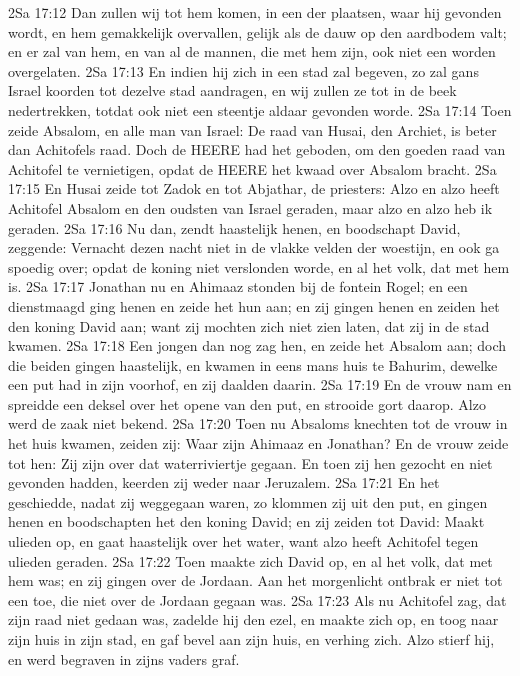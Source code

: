 2Sa 17:12  Dan zullen wij tot hem komen, in een der plaatsen, waar hij gevonden wordt, en hem gemakkelijk overvallen, gelijk als de dauw op den aardbodem valt; en er zal van hem, en van al de mannen, die met hem zijn, ook niet een worden overgelaten.
2Sa 17:13  En indien hij zich in een stad zal begeven, zo zal gans Israel koorden tot dezelve stad aandragen, en wij zullen ze tot in de beek nedertrekken, totdat ook niet een steentje aldaar gevonden worde.
2Sa 17:14  Toen zeide Absalom, en alle man van Israel: De raad van Husai, den Archiet, is beter dan Achitofels raad. Doch de HEERE had het geboden, om den goeden raad van Achitofel te vernietigen, opdat de HEERE het kwaad over Absalom bracht.
2Sa 17:15  En Husai zeide tot Zadok en tot Abjathar, de priesters: Alzo en alzo heeft Achitofel Absalom en den oudsten van Israel geraden, maar alzo en alzo heb ik geraden.
2Sa 17:16  Nu dan, zendt haastelijk henen, en boodschapt David, zeggende: Vernacht dezen nacht niet in de vlakke velden der woestijn, en ook ga spoedig over; opdat de koning niet verslonden worde, en al het volk, dat met hem is.
2Sa 17:17  Jonathan nu en Ahimaaz stonden bij de fontein Rogel; en een dienstmaagd ging henen en zeide het hun aan; en zij gingen henen en zeiden het den koning David aan; want zij mochten zich niet zien laten, dat zij in de stad kwamen.
2Sa 17:18  Een jongen dan nog zag hen, en zeide het Absalom aan; doch die beiden gingen haastelijk, en kwamen in eens mans huis te Bahurim, dewelke een put had in zijn voorhof, en zij daalden daarin.
2Sa 17:19  En de vrouw nam en spreidde een deksel over het opene van den put, en strooide gort daarop. Alzo werd de zaak niet bekend.
2Sa 17:20  Toen nu Absaloms knechten tot de vrouw in het huis kwamen, zeiden zij: Waar zijn Ahimaaz en Jonathan? En de vrouw zeide tot hen: Zij zijn over dat waterriviertje gegaan. En toen zij hen gezocht en niet gevonden hadden, keerden zij weder naar Jeruzalem.
2Sa 17:21  En het geschiedde, nadat zij weggegaan waren, zo klommen zij uit den put, en gingen henen en boodschapten het den koning David; en zij zeiden tot David: Maakt ulieden op, en gaat haastelijk over het water, want alzo heeft Achitofel tegen ulieden geraden.
2Sa 17:22  Toen maakte zich David op, en al het volk, dat met hem was; en zij gingen over de Jordaan. Aan het morgenlicht ontbrak er niet tot een toe, die niet over de Jordaan gegaan was.
2Sa 17:23  Als nu Achitofel zag, dat zijn raad niet gedaan was, zadelde hij den ezel, en maakte zich op, en toog naar zijn huis in zijn stad, en gaf bevel aan zijn huis, en verhing zich. Alzo stierf hij, en werd begraven in zijns vaders graf.
